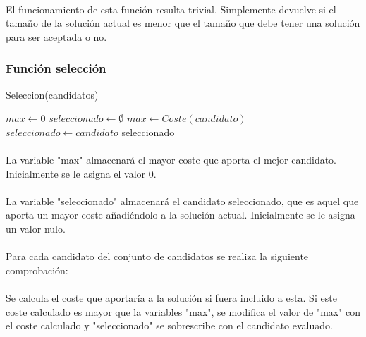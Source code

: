 \documentclass{article}
\begin{document}
		\paragraph{}El funcionamiento de esta función resulta trivial. Simplemente devuelve si el tamaño de la solución actual es menor que el tamaño que debe tener una solución para ser aceptada o no.

	\subsubsection{Función selección}
	\begin{algorithm}[H]
		\caption{Seleccion(candidatos)}
		\begin{algorithmic}
			\STATE $max \leftarrow 0$
			\STATE $seleccionado \leftarrow \emptyset$
			\STATE $max \leftarrow Coste(candidato)$
			\STATE $seleccionado \leftarrow candidato$ 
			\ENDIF
			\ENDFOR
			\RETURN seleccionado
		\end{algorithmic}
	\end{algorithm}

	\paragraph{}La variable "max" almacenará el mayor coste que aporta el mejor candidato. Inicialmente se le asigna el valor 0.
	
	\paragraph{}La variable "seleccionado" almacenará el candidato seleccionado, que es aquel que aporta un mayor coste añadiéndolo a la solución actual. Inicialmente se le asigna un valor nulo.
	
	\paragraph{}Para cada candidato del conjunto de candidatos se realiza la siguiente comprobación:
	
	\paragraph{}Se calcula el coste que aportaría a la solución si fuera incluido a esta. Si este coste calculado es mayor que la variables "max", se modifica el valor de "max" con el coste calculado y "seleccionado" se sobrescribe con el candidato evaluado.
	
\end{document}
